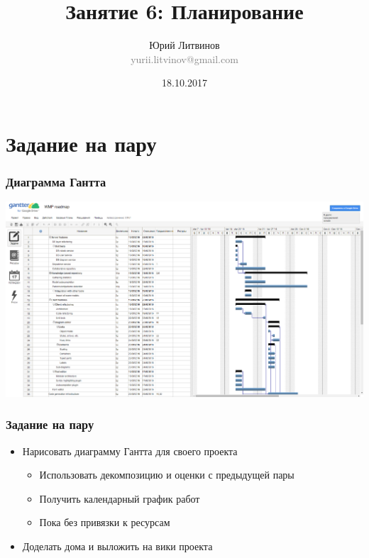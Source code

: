 \documentclass[xetex,mathserif,serif]{beamer}
\title{Занятие 6: Планирование}
\author[Юрий Литвинов]{Юрий Литвинов\\\small{\textcolor{gray}{yurii.litvinov@gmail.com}}}
\date{18.10.2017}
\begin{document}
	\frame{\titlepage}

	\section{Задание на пару}

	\begin{frame}
		\frametitle{Диаграмма Гантта}
		\begin{center}
			\includegraphics[width=\textwidth]{gantter.png}
		\end{center}
	\end{frame}

	\begin{frame}
		\frametitle{Задание на пару}
		\begin{itemize}
			\item Нарисовать диаграмму Гантта для своего проекта
			\begin{itemize}
				\item Использовать декомпозицию и оценки с предыдущей пары
				\item Получить календарный график работ
				\item Пока без привязки к ресурсам
			\end{itemize}
			\item Доделать дома и выложить на вики проекта
		\end{itemize}
	\end{frame}
\end{document}
